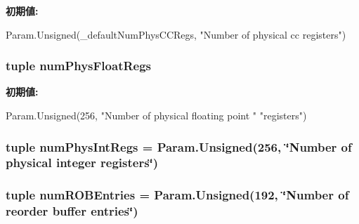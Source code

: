\label{classO3CPU_1_1DerivO3CPU_aae7d8cb15fc97d48c864e92f858edece}
{\bfseries 初期値:}
\begin{DoxyCode}
Param.Unsigned(_defaultNumPhysCCRegs,
                                   "Number of physical cc registers")
\end{DoxyCode}
\hypertarget{classO3CPU_1_1DerivO3CPU_aa014e3ffbc9e5c2cdee9cd256bcb9a94}{
\subsubsection[{numPhysFloatRegs}]{\setlength{\rightskip}{0pt plus 5cm}tuple {\bf numPhysFloatRegs}}}
\label{classO3CPU_1_1DerivO3CPU_aa014e3ffbc9e5c2cdee9cd256bcb9a94}
{\bfseries 初期値:}
\begin{DoxyCode}
Param.Unsigned(256, "Number of physical floating point "
                                      "registers")
\end{DoxyCode}
\hypertarget{classO3CPU_1_1DerivO3CPU_a4872233fcf1f251c1065c07bf3d288b4}{
\subsubsection[{numPhysIntRegs}]{\setlength{\rightskip}{0pt plus 5cm}tuple {\bf numPhysIntRegs} = Param.Unsigned(256, \char`\"{}Number of physical integer registers\char`\"{})}}
\label{classO3CPU_1_1DerivO3CPU_a4872233fcf1f251c1065c07bf3d288b4}
\hypertarget{classO3CPU_1_1DerivO3CPU_acb1025bcc322542b7e2fc418cd8d4308}{
\subsubsection[{numROBEntries}]{\setlength{\rightskip}{0pt plus 5cm}tuple {\bf numROBEntries} = Param.Unsigned(192, \char`\"{}Number of reorder buffer entries\char`\"{})}}
\label{classO3CPU_1_1DerivO3CPU_acb1025bcc322542b7e2fc418cd8d4308}

